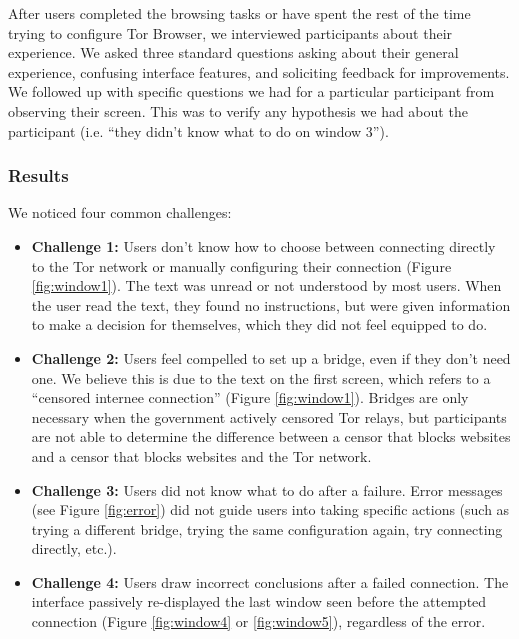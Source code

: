 \documentclass{template}
\begin{document}
After users completed the browsing tasks or have spent the rest of the time
trying to configure Tor Browser, we interviewed participants about their experience.
We asked three standard questions asking about their general experience, 
confusing interface features, and soliciting feedback for improvements. We followed up
with specific questions we had for a particular participant from observing their screen. 
This was to verify any hypothesis we had about the participant (i.e. ``they didn't know what to do on window 3'').  

\subsubsection{Results} 

{\color {red}
We noticed four common challenges:  

\begin{itemize} \itemsep1pt \parskip0pt 
\item {\bfseries Challenge 1:} Users don't know how to choose between connecting directly to the Tor network or manually configuring their connection (Figure \ref{fig:window1}). The text was unread or not understood by most users. When the user read the text, they found no instructions, but were given information to make a decision for themselves, which they did not feel equipped to do.  
\item {\bfseries Challenge 2:} Users feel compelled to set up a bridge, even if they don't need one. We believe this is due to the text on the first screen, which refers to a ``censored internee connection'' (Figure \ref{fig:window1}). Bridges are only necessary when the government actively censored Tor relays, but participants are not able to determine the difference between a censor that blocks websites and a censor that blocks websites and the Tor network. 
\item {\bfseries Challenge 3:} Users did not know what to do after a failure. Error messages (see Figure \ref{fig:error}) did not guide users into taking specific actions (such as trying a different bridge, trying the same configuration again, try connecting directly, etc.).
\item {\bfseries Challenge 4:} Users draw incorrect conclusions after a failed connection. The interface passively re-displayed the last window seen before the attempted connection (Figure \ref{fig:window4} or \ref{fig:window5}), regardless of the error.
\end{itemize}
}
\end{document}
